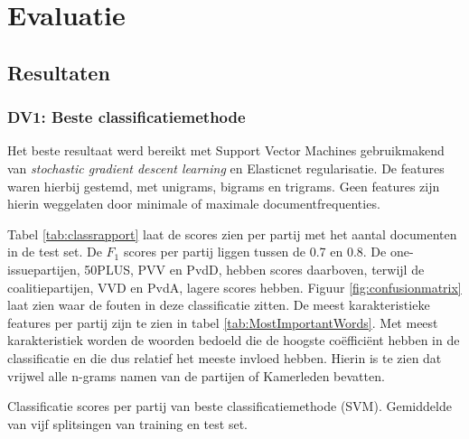 \section{Evaluatie}
\label{sec:eva}

\subsection{Resultaten}

\subsubsection{DV1: Beste classificatiemethode}
Het beste resultaat werd bereikt met Support Vector Machines gebruikmakend van \textit{stochastic gradient descent learning} en Elasticnet regularisatie. De features waren hierbij gestemd, met unigrams, bigrams en trigrams. Geen features zijn hierin weggelaten door minimale of maximale documentfrequenties. \par
Tabel \ref{tab:classrapport} laat de scores zien per partij met het aantal documenten in de test set. De $F_1$ scores per partij liggen tussen de 0.7 en 0.8. De one-issuepartijen, 50PLUS, PVV en PvdD, hebben scores daarboven, terwijl de coalitiepartijen, VVD en PvdA, lagere scores hebben. Figuur \ref{fig:confusionmatrix} laat zien waar de fouten in deze classificatie zitten. De meest karakteristieke features per partij zijn te zien in tabel \ref{tab:MostImportantWords}. Met meest karakteristiek worden de woorden bedoeld die de hoogste coëfficiënt hebben in de classificatie en die dus relatief het meeste invloed hebben. Hierin is te zien dat vrijwel alle n-grams namen van de partijen of Kamerleden bevatten.\par

\begin{table}[H]
\caption{Classificatie scores per partij van beste classificatiemethode (SVM). Gemiddelde van vijf splitsingen van training en test set.}
\label{tab:classrapport}
\centering

\end{table}


